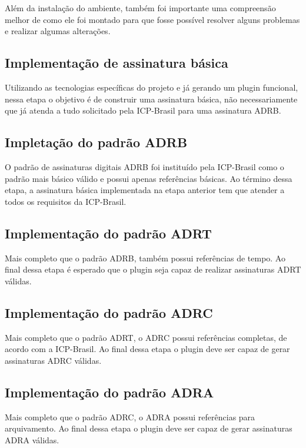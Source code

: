 Além da instalação do ambiente, também foi importante uma compreensão melhor de como ele foi montado para que fosse possível resolver alguns problemas
e realizar algumas alterações.

\subsection{Implementação de assinatura básica}

Utilizando as tecnologias específicas do projeto e já gerando um plugin funcional, nessa etapa o objetivo é de construir uma assinatura básica,
não necessariamente que já atenda a tudo solicitado pela ICP-Brasil para uma assinatura ADRB.

\subsection{Impletação do padrão ADRB}

O padrão de assinaturas digitais ADRB foi instituído pela ICP-Brasil como o padrão mais básico válido e possui apenas referências básicas.
Ao término dessa etapa, a assinatura básica implementada na etapa anterior tem que atender a todos os requisitos da ICP-Brasil.

\subsection{Implementação do padrão ADRT}

Mais completo que o padrão ADRB, também possui referências de tempo. Ao final dessa etapa é esperado que o plugin seja capaz de realizar assinaturas
ADRT válidas.

\subsection{Implementação do padrão ADRC}

Mais completo que o padrão ADRT, o ADRC possui referências completas, de acordo com a ICP-Brasil. Ao final dessa etapa o plugin deve ser capaz de gerar
assinaturas ADRC válidas.

\subsection{Implementação do padrão ADRA}

Mais completo que o padrão ADRC, o ADRA possui referências para arquivamento. Ao final dessa etapa o plugin deve ser capaz de gerar assinaturas
ADRA válidas.

